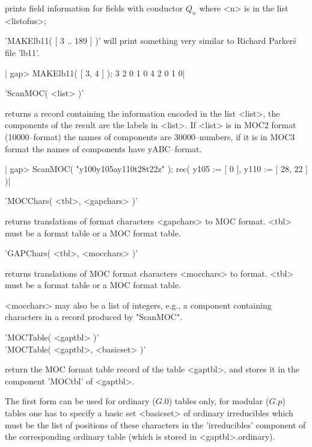 prints field information for fields with conductor $Q_n$ where <n> is in
the list <listofns>;

'MAKElb11( [ 3 .. 189 ] )' will print something very similar to
Richard Parker\'s file 'lb11'.

|    gap> MAKElb11( [ 3, 4 ] );
       3   2   0   1   0
       4   2   0   1   0|

%

'ScanMOC( <list> )'

returns a record containing the information encoded in the list <list>,
the components of the result are the labels in <list>.  If <list> is in
MOC2 format (10000--format) the names of components are 30000--numbers,
if it is in MOC3 format the names of components have yABC--format.

|    gap> ScanMOC( "y100y105ay110t28t22z" );
    rec(
      y105 := [ 0 ],
      y110 := [ 28, 22 ] )|

%

'MOCChars( <tbl>, <gapchars> )'

returns translations of {\GAP} format characters <gapchars> to MOC
format.  <tbl> must be a {\GAP} format table or a MOC format table.

%

'GAPChars( <tbl>, <mocchars> )'

returns translations of MOC format characters <mocchars> to {\GAP}
format.  <tbl> must be a {\GAP} format table or a MOC format table.

<mocchars> may also be a list of integers, e.g., a component containing
characters in a record produced by "ScanMOC".

%

'MOCTable( <gaptbl> )'\\
'MOCTable( <gaptbl>, <basicset> )'

return the MOC format table record of the {\GAP} table <gaptbl>, and
stores it in the component 'MOCtbl' of <gaptbl>.

The first form can be used for ordinary ($G.0$) tables only, for modular
($G.p$) tables one has to specify a basic set <basicset> of ordinary
irreducibles which must be the list of positions of these characters in
the 'irreducibles' component of the corresponding ordinary table (which
is stored in <gaptbl>.ordinary).

